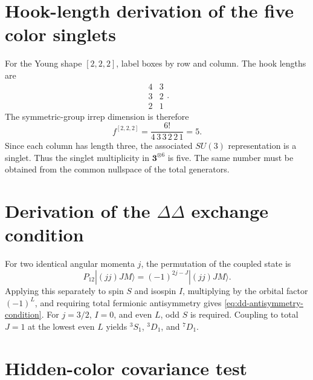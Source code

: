 \documentclass[11pt]{article}
\begin{document}
\appendix

\section{Hook-length derivation of the five color singlets}
\label{app:hook}

For the Young shape \([2,2,2]\), label boxes by row and column.  The hook lengths are
\begin{equation}
 \begin{matrix}
 4&3\\
 3&2\\
 2&1
 \end{matrix}.
\end{equation}
The symmetric-group irrep dimension is therefore
\begin{equation}
 f^{[2,2,2]}
 =\frac{6!}{4\,3\,3\,2\,2\,1}=5.
\end{equation}
Since each column has length three, the associated \(SU(3)\) representation is a singlet.  Thus the singlet multiplicity in \(\bm3^{\otimes6}\) is five.  The same number must be obtained from the common nullspace of the total generators.

\section{Derivation of the \texorpdfstring{\(\Delta\Delta\)}{DeltaDelta} exchange condition}
\label{app:dd-exchange}

For two identical angular momenta \(j\), the permutation of the coupled state is
\begin{equation}
 P_{12}|(jj)JM\rangle
 =(-1)^{2j-J}|(jj)JM\rangle.
\end{equation}
Applying this separately to spin \(S\) and isospin \(I\), multiplying by the orbital factor \((-1)^L\), and requiring total fermionic antisymmetry gives \cref{eq:dd-antisymmetry-condition}.  For \(j=3/2\), \(I=0\), and even \(L\), odd \(S\) is required.  Coupling to total \(J=1\) at the lowest even \(L\) yields \({}^3S_1\), \({}^3D_1\), and \({}^7D_1\).

\section{Hidden-color covariance test}
\label{app:hidden-test}
\end{document}
